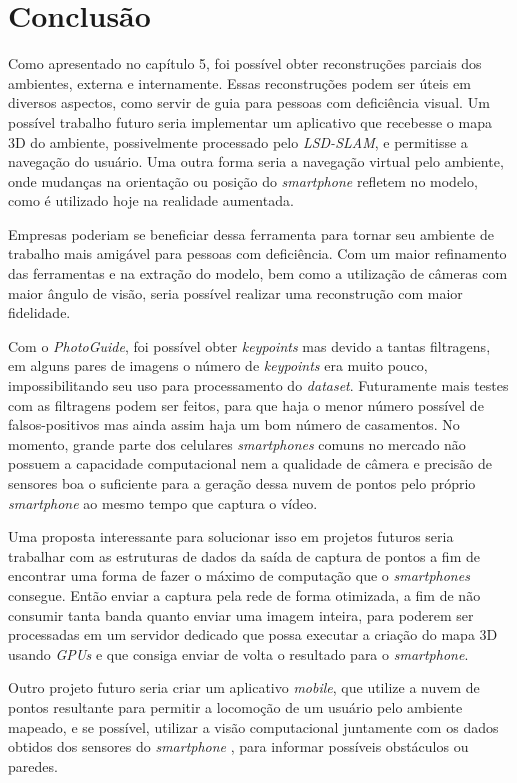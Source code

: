 \chapter{Conclusão}
Como apresentado no capítulo 5, foi possível obter reconstruções parciais dos ambientes, externa e internamente. Essas reconstruções podem ser úteis em diversos aspectos, como servir de guia para pessoas com deficiência visual. Um possível trabalho futuro seria implementar um aplicativo que recebesse o mapa 3D do ambiente, possivelmente processado pelo \textit{LSD-SLAM}, e permitisse a navegação do usuário. Uma outra forma seria a navegação virtual pelo ambiente, onde mudanças na orientação ou posição do \textit{smartphone} refletem no modelo, como é utilizado hoje na realidade aumentada.

Empresas poderiam se beneficiar dessa ferramenta para tornar seu ambiente de trabalho mais amigável para pessoas com deficiência. Com um maior refinamento das ferramentas e na extração do modelo, bem como a utilização de câmeras com maior ângulo de visão, seria possível realizar uma reconstrução com maior fidelidade. 

Com o \textit{PhotoGuide}, foi possível obter \textit{keypoints} mas devido a tantas filtragens, em alguns pares de imagens o número de \textit{keypoints} era muito pouco, impossibilitando seu uso para processamento do \textit{dataset}. Futuramente mais testes com as filtragens podem ser feitos, para que haja o menor número possível de falsos-positivos mas ainda assim haja um bom número de casamentos. No momento, grande parte dos celulares \textit{smartphones} comuns no mercado não possuem a capacidade computacional nem a qualidade de câmera e precisão de sensores boa o suficiente para a geração dessa nuvem de pontos pelo próprio \textit{smartphone} ao mesmo tempo que captura o vídeo. 
 
Uma proposta interessante para solucionar isso em projetos futuros seria trabalhar com as estruturas de dados da saída de captura de pontos a fim de encontrar uma forma de fazer o máximo de computação que o \textit{smartphones} consegue. Então enviar a captura pela rede de forma otimizada, a fim de não consumir tanta banda quanto enviar uma imagem inteira, para poderem ser processadas em um servidor dedicado que possa executar a criação do mapa 3D usando \textit{GPUs} e que consiga enviar de volta o resultado para o \textit{smartphone}.
	
Outro projeto futuro seria criar um aplicativo \textit{mobile}, que utilize a nuvem de pontos resultante para permitir a locomoção de um usuário pelo ambiente mapeado, e se possível, utilizar a visão computacional juntamente com os dados obtidos dos sensores do \textit{smartphone} , para informar possíveis obstáculos ou paredes.

